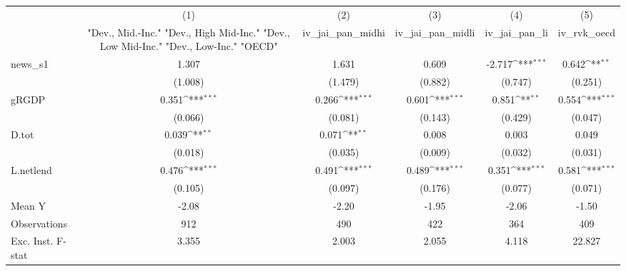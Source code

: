 {
\def\sym#1{\ifmmode^{#1}\else\(^{#1}\)\fi}
\begin{tabular}{l*{5}{c}}
\toprule
            &\multicolumn{1}{c}{(1)}&\multicolumn{1}{c}{(2)}&\multicolumn{1}{c}{(3)}&\multicolumn{1}{c}{(4)}&\multicolumn{1}{c}{(5)}\\
            &\multicolumn{1}{c}{ "Dev., Mid.-Inc." "Dev., High Mid-Inc." "Dev., Low Mid-Inc." "Dev., Low-Inc." "OECD" }&\multicolumn{1}{c}{iv\_jai\_pan\_midhi}&\multicolumn{1}{c}{iv\_jai\_pan\_midli}&\multicolumn{1}{c}{iv\_jai\_pan\_li}&\multicolumn{1}{c}{iv\_rvk\_oecd}\\
\midrule
news\_s1     &       1.307         &       1.631         &       0.609         &      -2.717\sym{***}&       0.642\sym{**} \\
            &     (1.008)         &     (1.479)         &     (0.882)         &     (0.747)         &     (0.251)         \\
\addlinespace
gRGDP       &       0.351\sym{***}&       0.266\sym{***}&       0.601\sym{***}&       0.851\sym{**} &       0.554\sym{***}\\
            &     (0.066)         &     (0.081)         &     (0.143)         &     (0.429)         &     (0.047)         \\
\addlinespace
D.tot       &       0.039\sym{**} &       0.071\sym{**} &       0.008         &       0.003         &       0.049         \\
            &     (0.018)         &     (0.035)         &     (0.009)         &     (0.032)         &     (0.031)         \\
\addlinespace
L.netlend   &       0.476\sym{***}&       0.491\sym{***}&       0.489\sym{***}&       0.351\sym{***}&       0.581\sym{***}\\
            &     (0.105)         &     (0.097)         &     (0.176)         &     (0.077)         &     (0.071)         \\
\midrule
Mean Y      &       -2.08         &       -2.20         &       -1.95         &       -2.06         &       -1.50         \\
Observations&         912         &         490         &         422         &         364         &         409         \\
Exc. Inst. F-stat&       3.355         &       2.003         &       2.055         &       4.118         &      22.827         \\
\bottomrule
\end{tabular}
}

